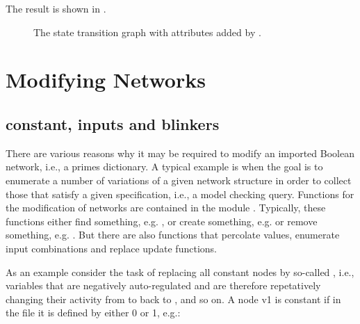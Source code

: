 \documentclass[letterpaper,10pt,english]{sphinxmanual}
\begin{document}
The result is shown in {\hyperref[\detokenize{Manual:figure16}]{}}.

\begin{figure}[htbp]
\centering
\capstart

\noindent{}
\caption{The state transition graph  with attributes added by {\hyperref[\detokenize{InteractionGraphs:add-style-default}]{}}.}\label{\detokenize{Manual:figure16}}\label{\detokenize{Manual:id20}}\end{figure}


\section{Modifying Networks}
\label{\detokenize{Manual:sec-modifying-networks}}\label{\detokenize{Manual:modifying-networks}}

\subsection{constant, inputs and blinkers}
\label{\detokenize{Manual:constant-inputs-and-blinkers}}
There are various reasons why it may be required to modify an imported Boolean network, i.e., a primes dictionary.
A typical example is when the goal is to enumerate a number of variations of a given network structure in order to collect those that satisfy a given specification, i.e., a model checking query.
Functions for the modification of networks are contained in the module {\hyperref[\detokenize{PrimeImplicants:primeimplicants}]{}}.
Typically, these functions either find something, e.g. {\hyperref[\detokenize{PrimeImplicants:find-inputs}]{}},
or create something, e.g. {\hyperref[\detokenize{PrimeImplicants:create-constants}]{}} or remove something, e.g. {\hyperref[\detokenize{PrimeImplicants:remove-variables}]{}}.
But there are also functions that percolate values, enumerate input combinations and replace update functions.

As an example consider the task of replacing all constant nodes by so-called , i.e.,
variables that are negatively auto-regulated and are therefore repetatively changing their activity from  to  back to , and so on.
A node v1 is constant if in the  file it is defined by either 0 or 1, e.g.:
\end{document}
